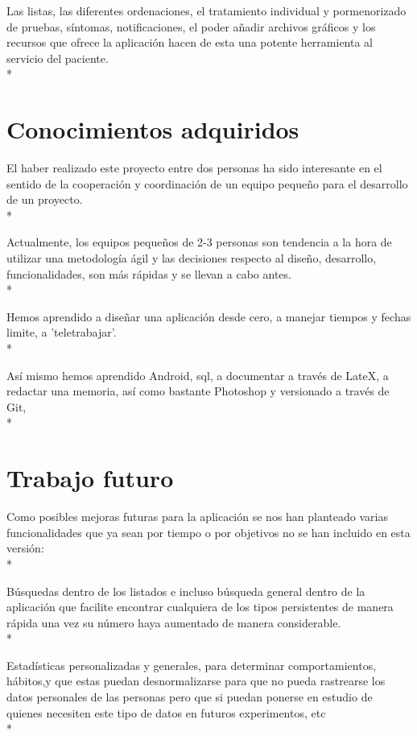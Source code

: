 \documentclass[../pfc.tex]{subfiles}
\begin{document}
	Las listas, las diferentes ordenaciones, el tratamiento individual y pormenorizado de pruebas, síntomas, notificaciones, el poder añadir archivos gráficos y los recursos que ofrece la aplicación hacen de esta una potente herramienta al servicio del paciente.\\*
		
	
	\section{Conocimientos adquiridos}
	
	El haber realizado este proyecto entre dos personas ha sido interesante en el sentido de la cooperación y coordinación de un equipo pequeño para el desarrollo de un proyecto.\\*
	
	Actualmente, los equipos pequeños de 2-3 personas son tendencia a la hora de utilizar una metodología ágil y las decisiones respecto al diseño, desarrollo, funcionalidades, son más rápidas y se llevan a cabo antes.\\*
	
	Hemos aprendido a diseñar una aplicación desde cero, a manejar tiempos y fechas limite, a 'teletrabajar'.\\*
	
	Así mismo hemos aprendido Android, sql, a documentar a través de LateX, a redactar una memoria, así como bastante Photoshop y  versionado a través de Git,\\*
		
	
	\section{Trabajo futuro}
	
	Como posibles mejoras futuras para la aplicación se nos han planteado varias funcionalidades que ya sean por tiempo o por objetivos no se han incluido en esta versión:\\*	
	
	Búsquedas dentro de los listados e incluso búsqueda general dentro de la aplicación que facilite encontrar cualquiera de los tipos persistentes de manera rápida una vez su número haya aumentado de manera considerable.\\*
	
	Estadísticas personalizadas y generales, para determinar comportamientos, hábitos,y que estas puedan desnormalizarse para que no pueda rastrearse los datos personales de las personas pero que si puedan ponerse en estudio de quienes necesiten este tipo de datos en futuros experimentos, etc \\*
	
\end{document}
